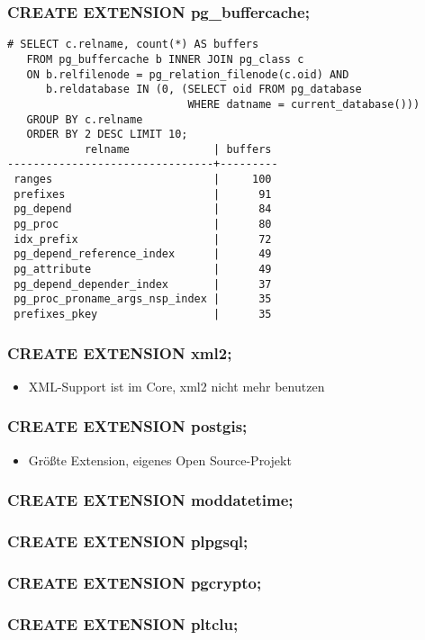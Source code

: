 \documentclass[utf8,hyperref={pdftex,colorlinks,linkcolor=black,citecolor=black,urlcolor=black,filecolor=black,plainpages=false},xcolor=table,hyperref]{beamer}
\begin{document}
\begin{frame}[containsverbatim]
	\frametitle{CREATE EXTENSION pg_buffercache;}
	\small
	\begin{verbatim}
# SELECT c.relname, count(*) AS buffers
   FROM pg_buffercache b INNER JOIN pg_class c
   ON b.relfilenode = pg_relation_filenode(c.oid) AND
      b.reldatabase IN (0, (SELECT oid FROM pg_database
                            WHERE datname = current_database()))
   GROUP BY c.relname
   ORDER BY 2 DESC LIMIT 10;
            relname             | buffers 
--------------------------------+---------
 ranges                         |     100
 prefixes                       |      91
 pg_depend                      |      84
 pg_proc                        |      80
 idx_prefix                     |      72
 pg_depend_reference_index      |      49
 pg_attribute                   |      49
 pg_depend_depender_index       |      37
 pg_proc_proname_args_nsp_index |      35
 prefixes_pkey                  |      35
 \end{verbatim}
\end{frame}

\begin{frame}[containsverbatim]
	\frametitle{CREATE EXTENSION xml2;}
	\begin{itemize}
		\item XML-Support ist im Core, xml2 nicht mehr benutzen
	\end{itemize}
\end{frame}

\begin{frame}[containsverbatim]
	\frametitle{CREATE EXTENSION postgis;}
	\begin{itemize}
		\item Größte Extension, eigenes Open Source-Projekt
	\end{itemize}
\end{frame}

\begin{frame}[containsverbatim]
	\frametitle{CREATE EXTENSION moddatetime;}
\end{frame}

\begin{frame}[containsverbatim]
	\frametitle{CREATE EXTENSION plpgsql;}
\end{frame}

\begin{frame}[containsverbatim]
	\frametitle{CREATE EXTENSION pgcrypto;}
\end{frame}

\begin{frame}[containsverbatim]
	\frametitle{CREATE EXTENSION pltclu;}
\end{frame}
\end{document}
